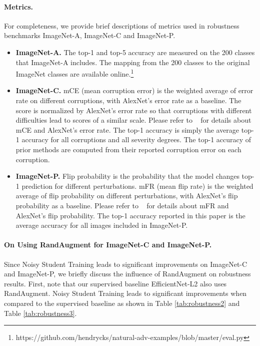 \documentclass[10pt,twocolumn,letterpaper]{article}
\begin{document}
\paragraph{Metrics.} For completeness, we provide brief descriptions of metrics used in robustness benchmarks ImageNet-A, ImageNet-C and ImageNet-P.
\begin{itemize}
    \item \textbf{ImageNet-A.} The top-1 and top-5 accuracy are measured on the 200 classes that ImageNet-A includes. The mapping from the 200 classes to the original ImageNet classes are available online.\footnote{https://github.com/hendrycks/natural-adv-examples/blob/master/eval.py}
    \item \textbf{ImageNet-C.} mCE (mean corruption error) is the weighted average of error rate on different corruptions, with AlexNet's error rate as a baseline. The score is normalized by AlexNet's error rate so that corruptions with different difficulties lead to scores of a similar scale. Please refer to ~\cite{hendrycks2018benchmarking} for details about mCE and AlexNet's error rate. The top-1 accuracy is simply the average top-1 accuracy for all corruptions and all severity degrees. The top-1 accuracy of prior methods are computed from their reported corruption error on each corruption.
\item \textbf{ImageNet-P.} Flip probability is the probability that the model changes top-1 prediction for different perturbations. mFR (mean flip rate) is the weighted average of flip probability on different perturbations, with AlexNet's flip probability as a baseline. Please refer to ~\cite{hendrycks2018benchmarking} for details about mFR and AlexNet's flip probability. The top-1 accuracy reported in this paper is the average accuracy for all images included in ImageNet-P.
\end{itemize}

\paragraph{On Using RandAugment for ImageNet-C and ImageNet-P.} 
Since Noisy Student Training leads to significant  improvements on ImageNet-C and ImageNet-P, we briefly discuss the influence of RandAugment on robustness results. First, note that our supervised baseline EfficientNet-L2 also uses RandAugment. Noisy Student Training leads to significant improvements when compared to the supervised baseline as shown in Table \ref{tab:robustness2} and Table \ref{tab:robustness3}. 
\end{document}
